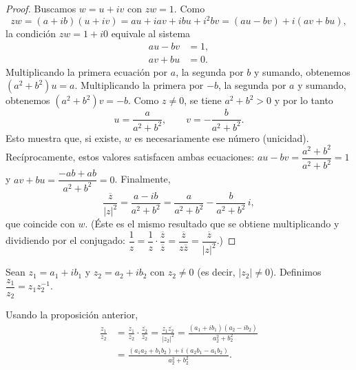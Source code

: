 \documentclass[12pt,a4paper]{book}
\begin{document}
  \begin{proof}
    Buscamos $w=u+iv$ con $zw=1$. Como
    \begin{equation*}
      zw=(a+ib)(u+iv)=au+iav+ibu+i^2bv=(au-bv)+i(av+bu),
    \end{equation*}
    la condición $zw=1+i0$ equivale al sistema
    \begin{align*}
      au-bv & = 1, \\
      av+bu & = 0.
    \end{align*}
    Multiplicando la primera ecuación por $a$, la segunda por $b$ y sumando, obtenemos $(a^2+b^2)u=a$. Multiplicando la primera por $-b$, la segunda por $a$ y sumando, obtenemos $(a^2+b^2)v=-b$. Como $z\neq 0$, se tiene $a^2+b^2>0$ y por lo tanto
    \begin{equation*}
      u=\frac{a}{a^2+b^2}, \qquad v=-\frac{b}{a^2+b^2}.
    \end{equation*}
    Esto muestra que, si existe, $w$ es necesariamente ese número (unicidad). Recíprocamente, estos valores satisfacen ambas ecuaciones: $au-bv=\dfrac{a^2+b^2}{a^2+b^2}=1$ y $av+bu=\dfrac{-ab+ab}{a^2+b^2}=0$. Finalmente,
    \begin{equation*}
      \frac{\overline{z}}{|z|^2}=\frac{a-ib}{a^2+b^2}=\frac{a}{a^2+b^2}-\frac{b}{a^2+b^2}\,i,
    \end{equation*}
    que coincide con $w$. (Éste es el mismo resultado que se obtiene multiplicando y dividiendo por el conjugado: $\dfrac{1}{z}=\dfrac{1}{z}\cdot\dfrac{\overline{z}}{\overline{z}}=\dfrac{\overline{z}}{z\overline{z}}=\dfrac{\overline{z}}{|z|^2}$.)
  \end{proof}

  \begin{definicion}
    Sean $z_1=a_1+ib_1$ y $z_2=a_2+ib_2$ con $z_2\neq 0$ (es decir, $|z_2|\neq 0$). Definimos $\dfrac{z_1}{z_2}=z_1z_2^{-1}$.
  \end{definicion}

  Usando la proposición anterior,
  \begin{align*}
    \frac{z_1}{z_2} & = \frac{z_1}{z_2}\cdot\frac{\overline{z_2}}{\overline{z_2}} = \frac{z_1\overline{z_2}}{|z_2|^2}
    = \frac{(a_1+ib_1)(a_2-ib_2)}{a_2^2+b_2^2}                                                                       \\
                    & = \frac{(a_1a_2+b_1b_2)+i\,(a_2b_1-a_1b_2)}{a_2^2+b_2^2}.
  \end{align*}

\end{document}

